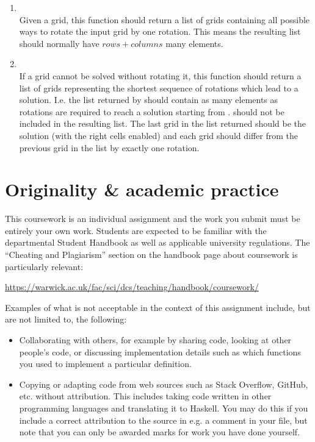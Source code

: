 \begin{enumerate}
	\item {}\\
	Given a grid, this function should return a list of grids containing all possible ways to rotate the input grid by one rotation. This means the resulting list should normally have $\mathit{rows} + \mathit{columns}$ many elements.
	
	\item {}\\
	If a grid cannot be solved without rotating it, this function should return a list of grids representing the shortest sequence of rotations which lead to a solution. I.e. the list returned by  should contain as many elements as rotations are required to reach a solution starting from .  should not be included in the resulting list. The last grid in the list returned should be the solution (with the right cells enabled) and each grid should differ from the previous grid in the list by exactly one rotation.
\end{enumerate}


\section{Originality \& academic practice}

This coursework is an individual assignment and the work you submit must be entirely your own work. Students are expected to be familiar with the departmental Student Handbook as well as applicable university regulations. The ``Cheating and Plagiarism'' section on the handbook page about coursework is particularly relevant:
\begin{center}\small
	\url{https://warwick.ac.uk/fac/sci/dcs/teaching/handbook/coursework/}
\end{center}
Examples of what is not acceptable in the context of this assignment include, but are not limited to, the following:
\begin{itemize}
	\item Collaborating with others, for example by sharing code, looking at other people's code, or discussing implementation details such as which functions you used to implement a particular definition. 
	
	\item Copying or adapting code from web sources such as Stack Overflow, GitHub, etc. without attribution. This includes taking code written in other programming languages and translating it to Haskell. You may do this if you include a correct attribution to the source in e.g. a comment in your file, but note that you can only be awarded marks for work you have done yourself. 
\end{itemize}

